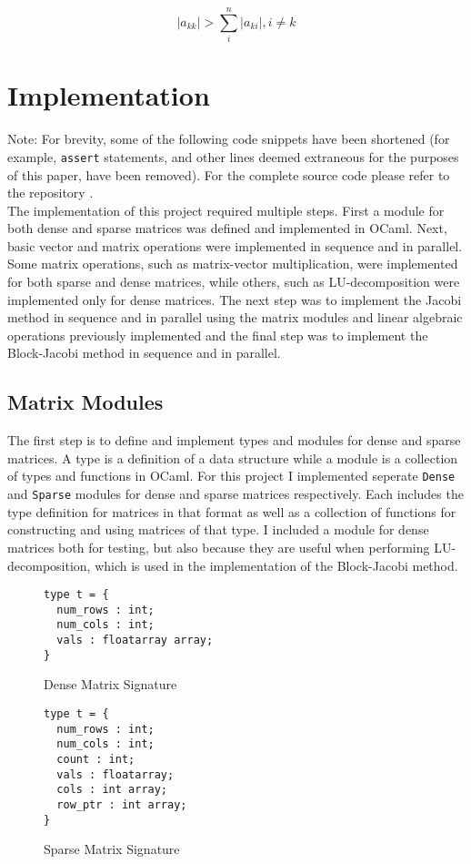 \documentclass[pageno]{jpaper}
\begin{document}
\begin{doublespacing}
$$|a_{kk}| > \sum_i^n |a_{ki}|, i \ne k$$

\section{Implementation}
Note: For brevity, some of the following code snippets have been shortened (for example, \verb|assert| statements, and other lines deemed extraneous for the purposes of this paper, have been removed). For the complete source code please refer to the repository \cite{github}.\\

The implementation of this project required multiple steps. First a module for both dense and sparse matrices was defined and implemented in OCaml. Next, basic vector and matrix operations were implemented in sequence and in parallel. Some matrix operations, such as matrix-vector multiplication, were implemented for both sparse and dense matrices, while others, such as LU-decomposition were implemented only for dense matrices. The next step was to implement the Jacobi method in sequence and in parallel using the matrix modules and linear algebraic operations previously implemented and the final step was to implement the Block-Jacobi method in sequence and in parallel.

\subsection{Matrix Modules}
The first step is to define and implement types and modules for dense and sparse matrices. A type is a definition of a data structure while a module is a collection of types and functions in OCaml. For this project I implemented seperate \verb|Dense| and \verb|Sparse| modules for dense and sparse matrices respectively. Each includes the type definition for matrices in that format as well as a collection of functions for constructing and using matrices of that type. I included a module for dense matrices both for testing, but also because they are useful when performing LU-decomposition, which is used in the implementation of the Block-Jacobi method.

\begin{figure}[htbb]
\begin{minipage}[b]{0.5\linewidth}
\begin{verbatim}
type t = {
  num_rows : int;
  num_cols : int;
  vals : floatarray array;
}
\end{verbatim}
\caption{Dense Matrix Signature}
\label{fig:dense-sig}
\end{minipage}
\hspace{0.5cm}
\begin{minipage}[b]{0.5\linewidth}
\begin{verbatim}
type t = {
  num_rows : int;
  num_cols : int;
  count : int;
  vals : floatarray;
  cols : int array;
  row_ptr : int array;
}
\end{verbatim}
\caption{Sparse Matrix Signature}
\label{fig:sparse-sig}
\end{minipage}
\end{figure}


\end{doublespacing}
\end{document}
